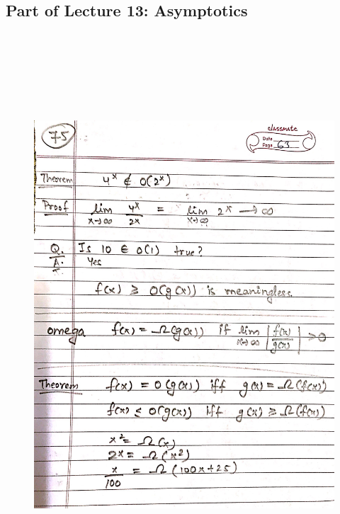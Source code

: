 \newpage
{\color{black} \subsection*{Part of Lecture 13: Asymptotics}}
\begin{figure}[H]
    \centering
    \includegraphics[width=16cm, height=21cm]{"./MIT-6.042J/MIT-6042J-075"}
\end{figure}

